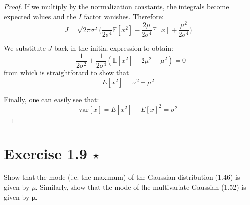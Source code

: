 \begin{proof}
    If we multiply by the normalization constants, the integrals become expected values and the
    $I$ factor vanishes. Therefore:
    \[
        J = \sqrt{2\pi \sigma^2} \bigg(\frac{1}{2\sigma^4} \mathbb{E}[x^2] - \frac{2\mu}{2\sigma^4} \mathbb{E}[x] + \frac{\mu^2}{2\sigma^4}\bigg)
    \] 

    We substitute $J$ back in the initial expression to obtain:
    \[
        -\frac{1}{2\sigma^2} + \frac{1}{2\sigma^4}(\mathbb{E}[x^2] - 2\mu^2 + \mu^2) = 0
    \] 
    from which is straightforard to show that 
    \begin{equation*}
        E[x^2] = \sigma^2 + \mu^2
        \tag{1.50}\label{eq:1.50}
    \end{equation*}

    Finally, one can easily see that:
    \begin{equation*}
        \text{var}[x] = E[x^2] - E[x]^2 = \sigma^2
        \tag{1.51}\label{eq:1.51}
    \end{equation*}
\end{proof}

\section*{Exercise 1.9 $\star$}
Show that the mode (i.e. the maximum) of the Gaussian distribution (1.46) is
given by $\mu$. Similarly, show that the mode of the multivariate Gaussian
(1.52) is given by $\bm{\mu}$. 

\vspace{1em}

